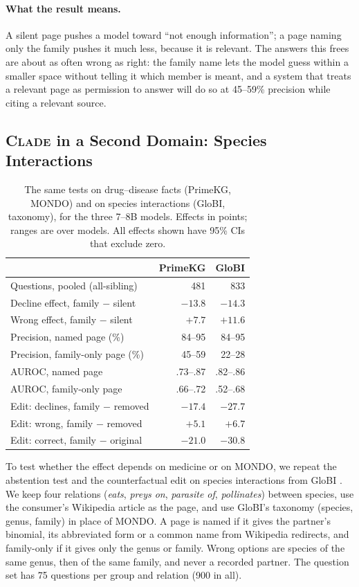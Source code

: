 \documentclass[letterpaper]{article} %
\newcommand{\clade}{\textsc{Clade}}
\begin{document}
\paragraph{What the result means.}
A silent page pushes a model toward ``not enough information''; a page naming
only the family pushes it much less, because it is relevant. The answers this
frees are about as often wrong as right: the family name lets the model guess
within a smaller space without telling it which member is meant, and a system
that treats a relevant page as permission to answer will do so at 45--59\%
precision while citing a relevant source.

\subsection{\clade{} in a Second Domain: Species Interactions}

\begin{table}[t]
\centering
\footnotesize
\setlength{\tabcolsep}{3pt}
\begin{tabular}{lrr}
\toprule
 & PrimeKG & GloBI \\
\midrule
Questions, pooled (all-sibling) & 481 & 833 \\
Decline effect, family $-$ silent & $-13.8$ & $-14.3$ \\
Wrong effect, family $-$ silent & $+7.7$ & $+11.6$ \\
Precision, named page (\%) & 84--95 & 84--95 \\
Precision, family-only page (\%) & 45--59 & 22--28 \\
AUROC, named page & .73--.87 & .82--.86 \\
AUROC, family-only page & .66--.72 & .52--.68 \\
Edit: declines, family $-$ removed & $-17.4$ & $-27.7$ \\
Edit: wrong, family $-$ removed & $+5.1$ & $+6.7$ \\
Edit: correct, family $-$ original & $-21.0$ & $-30.8$ \\
\bottomrule
\end{tabular}
\caption{The same tests on drug--disease facts (PrimeKG, MONDO) and on
species interactions (GloBI, taxonomy), for the three 7--8B models. Effects
in points; ranges are over models. All effects shown have 95\% CIs that
exclude zero.}
\label{tab:globi}
\end{table}

To test whether the effect depends on medicine or on MONDO, we repeat the
abstention test and the counterfactual edit on species interactions from
GloBI \citep{poelen2014globi}. We keep four relations (\emph{eats},
\emph{preys on}, \emph{parasite of}, \emph{pollinates}) between species,
use the consumer's Wikipedia article as the page, and use GloBI's taxonomy
(species, genus, family) in place of MONDO. A page is named if it gives the
partner's binomial, its abbreviated form or a common name from Wikipedia
redirects, and family-only if it gives only the genus or family. Wrong options
are species of the same genus, then of the same family, and never a recorded
partner. The question set has 75 questions per group and relation (900 in all).
\end{document}
